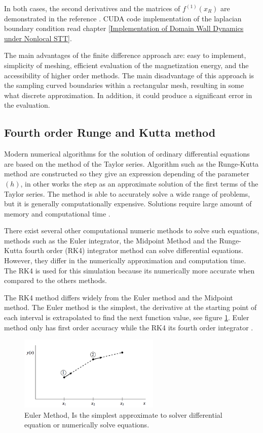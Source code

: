 In both cases, the second derivatives and the matrices of $f^{(1)}(x_R)$ are demonstrated in the reference \cite{methods}. CUDA code implementation of the laplacian boundary condition read chapter \ref{Implementation of Domain Wall Dynamics under Nonlocal STT}.

The main advantages of the finite difference approach are: easy to implement, simplicity of meshing, efficient evaluation of the magnetization energy, and the accessibility of higher order methods. The main disadvantage of this approach is the sampling curved boundaries within a rectangular mesh, resulting in some what discrete approximation. In addition, it could produce a significant error in the evaluation.

\subsection{Fourth order Runge and Kutta method}

 Modern numerical algorithms for the solution of ordinary differential equations are based on the method of the Taylor series. Algorithm such as the Runge-Kutta method are constructed so they give an expression depending of the parameter $(h)$, in other works the step as an approximate solution of the first terms of the Taylor series. The method is able to accurately solve a wide range of problems, but it is generally computationally expensive. Solutions require large amount of memory and computational time \cite{numerical}.

There exist several other computational numeric methods to solve such equations, methods such as the Euler integrator, the Midpoint Method and the Runge-Kutta fourth order (RK4) integrator method can solve differential equations. However, they differ in the numerically approximation and computation time. The RK4 is used for this simulation because its numerically more accurate when compared to the others methods.

The RK4 method differs widely from the Euler method and the Midpoint method. The Euler method is the simplest, the derivative at the starting point of each interval is extrapolated to find the next function value, see figure \ref{fig:euler}. Euler method only has first order accuracy while the RK4 its fourth order integrator \cite{numerical}.

\begin{figure}[htbp]
	\centering
		\includegraphics[width=0.6\textwidth]{Figures/euler.png}
		\smallskip
	\caption[Euler Method]{Euler Method, Is the simplest approximate to solver differential equation or numerically solve equations.}
	\label{fig:euler}
\end{figure}

